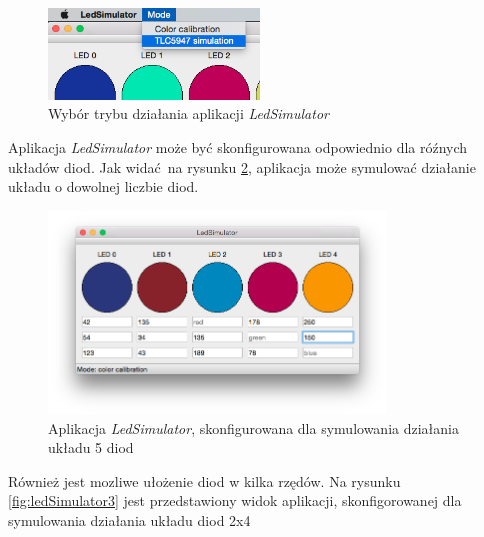 \documentclass[eng,printmode]{mgr}
\begin{document}
\begin{figure}[!ht]
    \centering
    \includegraphics[width=0.5\textwidth]{Figures/modes.png} 
    \caption{Wybór trybu działania aplikacji \emph{LedSimulator}}
    \label{fig:modes}
\end{figure}

Aplikacja \emph{LedSimulator} może być skonfigurowana odpowiednio dla róźnych układów diod. Jak widać na rysunku \ref{fig:ledSimulator4}, aplikacja może symulować działanie układu o dowolnej liczbie diod.

\begin{figure}[!ht]
    \centering
    \includegraphics[width=0.8\textwidth]{Figures/ledSimulator4.png} 
    \caption{Aplikacja \emph{LedSimulator}, skonfigurowana dla symulowania działania układu 5 diod}
    \label{fig:ledSimulator4}
\end{figure}

Również jest mozliwe ułożenie diod w kilka rzędów.
Na rysunku \ref{fig:ledSimulator3} jest przedstawiony widok aplikacji, skonfigorowanej dla symulowania działania układu diod 2x4
\end{document}
